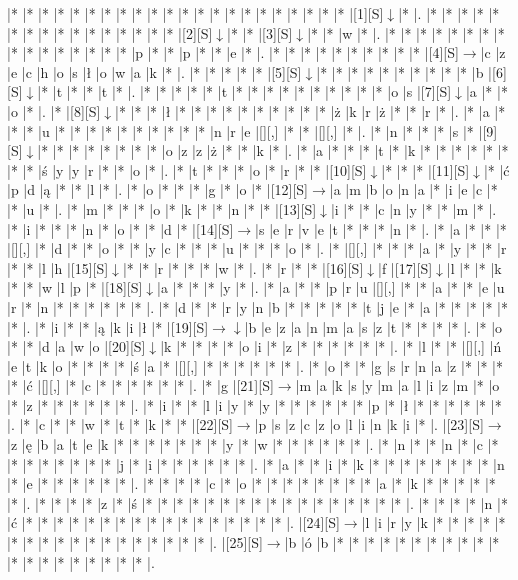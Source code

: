 \documentclass[11pt]{article}
\newcommand\drarr{$\rightarrow \!\!\!\!\! \downarrow$}
\newcommand\rarr{$\rightarrow$}
\newcommand\darr{$\downarrow$}
\begin{document}
\noindent\begin{Puzzle}{23}{33}|*	|*	|*	|*	|*	|*	|*	|*	|*	|*	|*	|*	|*	|*	|*	|*	|*	|*	|*	|*	|*	|*	|[1][S]\darr	|*	|.
|*	|*	|*	|*	|*	|*	|*	|*	|*	|*	|*	|*	|*	|*	|*	|*	|[2][S]\darr	|*	|*	|[3][S]\darr	|*	|*	|w	|*	|.
|*	|*	|*	|*	|*	|*	|*	|*	|*	|*	|*	|*	|*	|*	|*	|*	|p	|*	|*	|p	|*	|*	|e	|*	|.
|*	|*	|*	|*	|*	|*	|*	|*	|*	|*	|[4][S]\rarr	|c	|z	|e	|c	|h	|o	|s	|ł	|o	|w	|a	|k	|*	|.
|*	|*	|*	|*	|*	|[5][S]\darr	|*	|*	|*	|*	|*	|*	|*	|*	|*	|*	|b	|[6][S]\darr	|*	|t	|*	|*	|t	|*	|.
|*	|*	|*	|*	|*	|t	|*	|*	|*	|*	|*	|*	|*	|*	|*	|*	|o	|s	|[7][S]\darr	|a	|*	|*	|o	|*	|.
|*	|[8][S]\darr	|*	|*	|*	|ł	|*	|*	|*	|*	|*	|*	|*	|*	|*	|*	|ż	|k	|r	|ż	|*	|*	|r	|*	|.
|*	|a	|*	|*	|*	|u	|*	|*	|*	|*	|*	|*	|*	|*	|*	|*	|n	|r	|e	|[][,]{ }	|*	|*	|[][,]{ }	|*	|.
|*	|n	|*	|*	|*	|s	|*	|[9][S]\darr	|*	|*	|*	|*	|*	|*	|*	|*	|o	|z	|z	|ż	|*	|*	|k	|*	|.
|*	|a	|*	|*	|*	|t	|*	|k	|*	|*	|*	|*	|*	|*	|*	|*	|ś	|y	|y	|r	|*	|*	|o	|*	|.
|*	|t	|*	|*	|*	|o	|*	|r	|*	|*	|[10][S]\darr	|*	|*	|*	|[11][S]\darr	|*	|ć	|p	|d	|ą	|*	|*	|l	|*	|.
|*	|o	|*	|*	|*	|g	|*	|o	|*	|[12][S]\rarr	|a	|m	|b	|o	|n	|a	|*	|i	|e	|c	|*	|*	|u	|*	|.
|*	|m	|*	|*	|*	|o	|*	|k	|*	|*	|n	|*	|*	|[13][S]\darr	|i	|*	|*	|c	|n	|y	|*	|*	|m	|*	|.
|*	|i	|*	|*	|*	|n	|*	|o	|*	|*	|d	|*	|[14][S]\rarr	|s	|e	|r	|v	|e	|t	|*	|*	|*	|n	|*	|.
|*	|a	|*	|*	|*	|[][,]{ }	|*	|d	|*	|*	|o	|*	|*	|y	|c	|*	|*	|*	|u	|*	|*	|*	|o	|*	|.
|*	|[][,]{ }	|*	|*	|*	|a	|*	|y	|*	|*	|r	|*	|*	|l	|h	|[15][S]\darr	|*	|*	|r	|*	|*	|*	|w	|*	|.
|*	|r	|*	|*	|[16][S]\darr	|f	|[17][S]\darr	|l	|*	|*	|k	|*	|*	|w	|l	|p	|*	|[18][S]\darr	|a	|*	|*	|*	|y	|*	|.
|*	|a	|*	|*	|p	|r	|u	|[][,]{ }	|*	|*	|a	|*	|*	|e	|u	|r	|*	|n	|*	|*	|*	|*	|*	|*	|.
|*	|d	|*	|*	|r	|y	|n	|b	|*	|*	|*	|*	|*	|t	|j	|e	|*	|a	|*	|*	|*	|*	|*	|*	|.
|*	|i	|*	|*	|ą	|k	|i	|ł	|*	|[19][S]\drarr	|b	|e	|z	|a	|n	|m	|a	|s	|z	|t	|*	|*	|*	|*	|.
|*	|o	|*	|*	|d	|a	|w	|o	|[20][S]\darr	|k	|*	|*	|*	|*	|o	|i	|*	|z	|*	|*	|*	|*	|*	|*	|.
|*	|l	|*	|*	|[][,]{ }	|ń	|e	|t	|k	|o	|*	|*	|*	|*	|ś	|a	|*	|[][,]{ }	|*	|*	|*	|*	|*	|*	|.
|*	|o	|*	|*	|g	|s	|r	|n	|a	|z	|*	|*	|*	|*	|ć	|[][,]{ }	|*	|c	|*	|*	|*	|*	|*	|*	|.
|*	|g	|[21][S]\rarr	|m	|a	|k	|s	|y	|m	|a	|l	|i	|z	|m	|*	|o	|*	|z	|*	|*	|*	|*	|*	|*	|.
|*	|i	|*	|*	|l	|i	|y	|*	|y	|*	|*	|*	|*	|*	|*	|p	|*	|ł	|*	|*	|*	|*	|*	|*	|.
|*	|c	|*	|*	|w	|*	|t	|*	|k	|*	|*	|[22][S]\rarr	|p	|s	|z	|c	|z	|o	|l	|i	|n	|k	|i	|*	|.
|[23][S]\rarr	|z	|ę	|b	|a	|t	|e	|k	|*	|*	|*	|*	|*	|*	|*	|y	|*	|w	|*	|*	|*	|*	|*	|*	|.
|*	|n	|*	|*	|n	|*	|c	|*	|*	|*	|*	|*	|*	|*	|*	|j	|*	|i	|*	|*	|*	|*	|*	|*	|.
|*	|a	|*	|*	|i	|*	|k	|*	|*	|*	|*	|*	|*	|*	|*	|n	|*	|e	|*	|*	|*	|*	|*	|*	|.
|*	|*	|*	|*	|c	|*	|o	|*	|*	|*	|*	|*	|*	|*	|*	|a	|*	|k	|*	|*	|*	|*	|*	|*	|.
|*	|*	|*	|*	|z	|*	|ś	|*	|*	|*	|*	|*	|*	|*	|*	|*	|*	|*	|*	|*	|*	|*	|*	|*	|.
|*	|*	|*	|*	|n	|*	|ć	|*	|*	|*	|*	|*	|*	|*	|*	|*	|*	|*	|*	|*	|*	|*	|*	|*	|.
|[24][S]\rarr	|l	|i	|r	|y	|k	|*	|*	|*	|*	|*	|*	|*	|*	|*	|*	|*	|*	|*	|*	|*	|*	|*	|*	|.
|[25][S]\rarr	|b	|ó	|b	|*	|*	|*	|*	|*	|*	|*	|*	|*	|*	|*	|*	|*	|*	|*	|*	|*	|*	|*	|*	|.\end{Puzzle}
\end{document}
